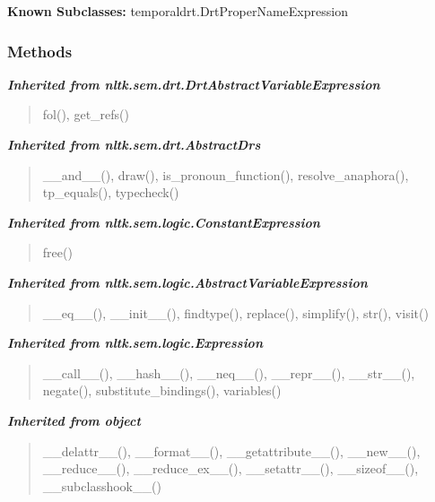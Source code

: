 \textbf{Known Subclasses:} temporaldrt.DrtProperNameExpression



  \subsubsection{Methods}


\large{\textbf{\textit{Inherited from nltk.sem.drt.DrtAbstractVariableExpression}}}

\begin{quote}
fol(), get\_refs()
\end{quote}

\large{\textbf{\textit{Inherited from nltk.sem.drt.AbstractDrs}}}

\begin{quote}
\_\_and\_\_(), draw(), is\_pronoun\_function(), resolve\_anaphora(), tp\_equals(), typecheck()
\end{quote}

\large{\textbf{\textit{Inherited from nltk.sem.logic.ConstantExpression}}}

\begin{quote}
free()
\end{quote}

\large{\textbf{\textit{Inherited from nltk.sem.logic.AbstractVariableExpression}}}

\begin{quote}
\_\_eq\_\_(), \_\_init\_\_(), findtype(), replace(), simplify(), str(), visit()
\end{quote}

\large{\textbf{\textit{Inherited from nltk.sem.logic.Expression}}}

\begin{quote}
\_\_call\_\_(), \_\_hash\_\_(), \_\_neq\_\_(), \_\_repr\_\_(), \_\_str\_\_(), negate(), substitute\_bindings(), variables()
\end{quote}

\large{\textbf{\textit{Inherited from object}}}

\begin{quote}
\_\_delattr\_\_(), \_\_format\_\_(), \_\_getattribute\_\_(), \_\_new\_\_(), \_\_reduce\_\_(), \_\_reduce\_ex\_\_(), \_\_setattr\_\_(), \_\_sizeof\_\_(), \_\_subclasshook\_\_()
\end{quote}


